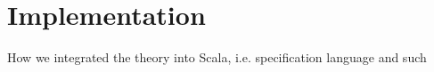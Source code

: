 \section{Implementation}

How we integrated the theory into Scala, i.e. specification language and such